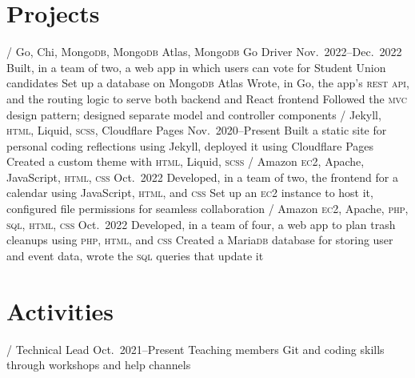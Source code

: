 \section{Projects}
\begin{doutline}
     / Go, Chi, Mongo\textsc{db}, Mongo\textsc{db} Atlas, Mongo\textsc{db} Go Driver
    \hfill Nov.\ 2022--Dec.\ 2022
        \2 Built, in a team of two, a web app in which users can vote for Student Union candidates
            \3 Set up a database on Mongo\textsc{db} Atlas
            \3 Wrote, in Go, the app's \textsc{rest} \textsc{api}, and the routing logic to serve both backend and React frontend
            \3 Followed the \textsc{mvc} design pattern; designed separate model and controller components
     / Jekyll, \textsc{html}, Liquid, \textsc{scss}, Cloudflare Pages
    \hfill Nov.\ 2020--Present
        \2 Built a static site for personal coding reflections using Jekyll, deployed it using Cloudflare Pages
            \3 Created a custom theme with \textsc{html}, Liquid, \textsc{scss}
     / Amazon \textsc{ec2}, Apache, JavaScript, \textsc{html}, \textsc{css}
    \hfill Oct.\ 2022
        \2 Developed, in a team of two, the frontend for a calendar using JavaScript, \textsc{html}, and \textsc{css}
        \2 Set up an \textsc{ec2} instance to host it, configured file permissions for seamless collaboration
    \1[Trashfree] / Amazon \textsc{ec2}, Apache, \textsc{php}, \textsc{sql}, \textsc{html}, \textsc{css}
    \hfill Oct.\ 2022
        \2 Developed, in a team of four, a web app to plan trash cleanups using \textsc{php}, \textsc{html}, and \textsc{css}
        \2 Created a Maria\textsc{db} database for storing user and event data, wrote the \textsc{sql} queries that update it
\end{doutline}

\section{Activities}
\begin{doutline}
     / Technical Lead
    \hfill Oct.\ 2021--Present
        \2 Teaching members Git and coding skills through workshops and help channels
\end{doutline}
